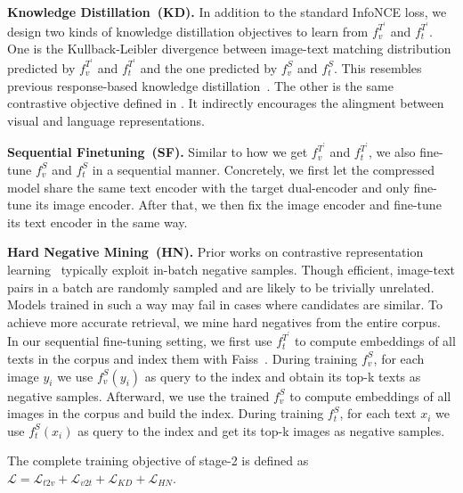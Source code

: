 \textbf{Knowledge Distillation~(KD).} In addition to the standard InfoNCE loss, we design two kinds of knowledge distillation objectives to learn from $f_v^{T^{\prime}}$ and $f_t^{T^{\prime}}$. One is the  Kullback-Leibler divergence between image-text matching distribution predicted by $f_v^{T^{\prime}}$ and $f_t^{T^{\prime}}$ and the one predicted by $f_v^{S}$ and $f_t^{S}$. This resembles previous response-based knowledge distillation~\cite{hinton2015distilling}. The other is the same contrastive objective  defined in . It indirectly encourages the alingment between visual and language representations.

\textbf{Sequential Finetuning~(SF).} Similar to how we get $f_v^{T^{\prime}}$ and $f_t^{T^{\prime}}$, we also fine-tune $f_v^{S}$ and $f_t^{S}$ in a sequential manner. Concretely, we first let the compressed model share the same text encoder with the target dual-encoder and only fine-tune its image encoder. After that, we then fix the image encoder and fine-tune its text encoder in the same way.

\textbf{Hard Negative Mining~(HN).} Prior works on contrastive representation learning~\cite{simclr,simcse}  typically exploit in-batch negative samples. Though efficient, image-text pairs in a batch are randomly sampled and are likely to be trivially unrelated. Models trained in such a way may fail in cases where candidates are similar. To achieve more accurate retrieval, we mine hard negatives from the entire corpus. In our sequential fine-tuning setting, we first use $f_t^{T^{\prime}}$ to compute embeddings of all texts in the corpus and index them with Faiss~\cite{faiss}. During training $f_v^{S}$, for each image $y_i$ we use $f_v^{S}(y_i)$ as query to the index and obtain its top-k texts as negative samples. Afterward, we use the trained $f_v^{S}$ to compute embeddings of all images in the corpus and build the index. During training $f_t^{S}$, for each text $x_i$ we use $f_t^{S}(x_i)$ as query to the index and get its top-k images as negative samples.

The complete training objective of stage-2 is  defined as $\mathcal{L}=\mathcal{L}_{t2v}+\mathcal{L}_{v2t}+\mathcal{L}_{KD}+\mathcal{L}_{HN}$.
